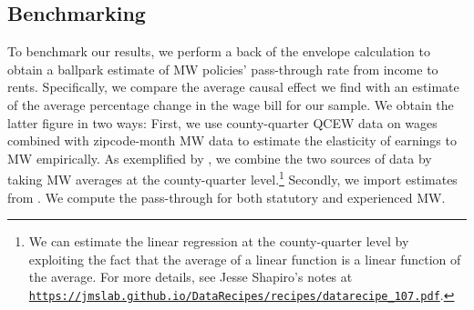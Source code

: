 \subsection{Benchmarking}\label{sec:discussion_benchmarking}
To benchmark our results, we perform a back of the envelope calculation to obtain a ballpark 
estimate of MW policies' pass-through rate from income to rents. Specifically, we compare the average 
causal effect we find with an estimate of the average percentage change in the wage 
bill for our sample. We obtain the latter figure in two ways: 
First, we use county-quarter QCEW data on wages 
combined with zipcode-month MW data to estimate the elasticity of earnings to MW empirically. 
As exemplified by \textcite{gentzkow2015newspapers}, we combine the two sources of data by 
taking MW averages at the county-quarter level.\footnote{We can estimate the linear 
	regression at the county-quarter level by exploiting the fact that the average of a linear 
	function is a linear function of the average. For more details, see Jesse Shapiro's notes at \href{https://jmslab.github.io/DataRecipes/recipes/datarecipe_107.pdf}{\texttt{https://jmslab.github.io/DataRecipes/recipes/datarecipe\_107.pdf}}.} 
Secondly, we import estimates from \textcite{CegnizEtAl2019}. We compute the pass-through for
both statutory and experienced MW. 




